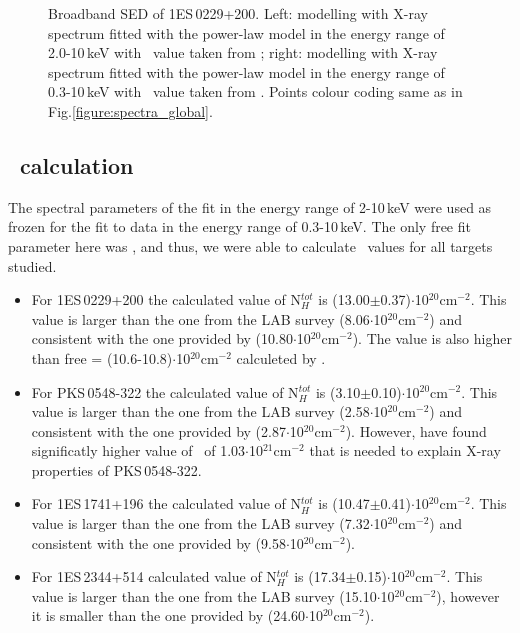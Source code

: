 \begin{figure*}

\caption[]{Broadband SED of 1ES\,0229+200. Left: modelling with X-ray spectrum fitted with the power-law model in the energy range of 2.0-10\,keV with \nh\ value taken from \cite{Kalberla2005}; right: modelling with X-ray spectrum fitted with the power-law model in the energy range of 0.3-10\,keV with \nh\ value taken from \cite{Willingale13}.
Points colour coding same as in Fig.\ref{figure:spectra_global}.}
\label{figure:spectra_limited}
\end{figure*}



\subsection{\nh\  calculation}
 The spectral parameters of the fit in the energy range of  2-10\,keV were used as frozen for the fit to data in the energy range of 0.3-10\,keV. 
The only free fit parameter here was \nh, and thus, we were able to calculate \nh\ values for all  targets studied. 



 
 
 
 \begin{itemize}
 \item
 For 1ES\,0229+200 the calculated value of N$_H^{tot}$ is (13.00$\pm$0.37)$\cdot$10$^{20}$cm$^{-2}$. This value is larger than the one from the LAB survey (8.06$\cdot$10$^{20}$cm$^{-2}$) and consistent with the one provided by \cite{Willingale13} (10.80$\cdot$10$^{20}$cm$^{-2}$). 
 The value is also higher than free \nh = (10.6-10.8)$\cdot$10$^{20}$cm$^{-2}$ calculeted by \cite{Kaufmann2011}.
 \item
 For PKS\,0548-322 the calculated value of N$_H^{tot}$ is (3.10$\pm$0.10)$\cdot$10$^{20}$cm$^{-2}$. This value is larger than the one from the LAB survey (2.58$\cdot$10$^{20}$cm$^{-2}$)  and consistent with the one  provided by \cite{Willingale13} (2.87$\cdot$10$^{20}$cm$^{-2}$).
 However, \cite{Sambruna_1998} have found significatly higher value of \nh\ of 1.03$\cdot$10$^{21}$cm$^{-2}$ that is needed to explain X-ray properties of PKS\,0548-322. 
  \item
 For 1ES\,1741+196 the calculated value of N$_H^{tot}$ is (10.47$\pm$0.41)$\cdot$10$^{20}$cm$^{-2}$. This value is larger than the one from the LAB survey (7.32$\cdot$10$^{20}$cm$^{-2}$)  and consistent with the one  provided by \cite{Willingale13} (9.58$\cdot$10$^{20}$cm$^{-2}$).
   \item
 For 1ES\,2344+514 calculated value of N$_H^{tot}$ is (17.34$\pm$0.15)$\cdot$10$^{20}$cm$^{-2}$. This value is larger than the one from the LAB survey (15.10$\cdot$10$^{20}$cm$^{-2}$), however it is smaller than  the one provided by \cite{Willingale13} (24.60$\cdot$10$^{20}$cm$^{-2}$).
\end{itemize}    



